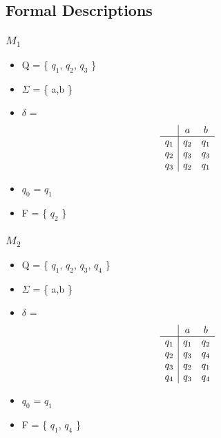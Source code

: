 \documentclass{article}
\begin{document}
\subsection{Formal Descriptions}
\subsubsection{$M_1$}

\begin{itemize}
  \item Q = \{ $q_1$, $q_2$, $q_3$ \}
  \item $\Sigma$ = \{ a,b \}
  \item $\delta$ = 
  \begin{displaymath}
  \begin{array}{c|c c}
       & a & b \\
       \hline
      q_1 & q_2 & q_1\\
      q_2 & q_3 & q_3\\
      q_3 & q_2 & q_1
  \end{array}
  \end{displaymath}
  \item $q_0$ = $q_1$
  \item F = \{ $q_2$ \}
\end{itemize}

\subsubsection{$M_2$}

\begin{itemize}
  \item Q = \{ $q_1$, $q_2$, $q_3$, $q_4$ \}
  \item $\Sigma$ = \{ a,b \}
  \item $\delta$ = 
  \begin{displaymath}
  \begin{array}{c|c c}
       & a & b \\
       \hline
      q_1 & q_1 & q_2\\
      q_2 & q_3 & q_4\\
      q_3 & q_2 & q_1\\
      q_4 & q_3 & q_4
  \end{array}
  \end{displaymath}
  \item $q_0$ = $q_1$
  \item F = \{ $q_1$, $q_4$ \}
\end{itemize}
\end{document}
